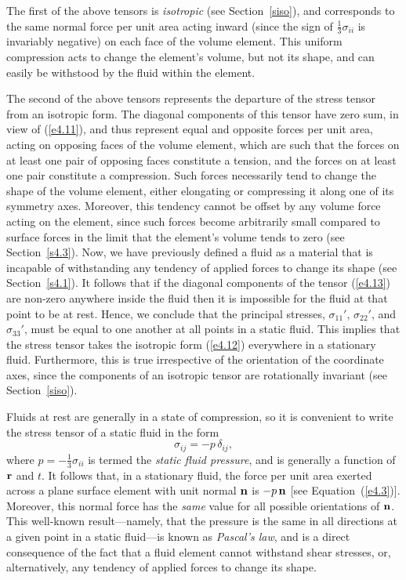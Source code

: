 The first of the above tensors is {\em isotropic}\/ (see Section~\ref{siso}), and corresponds to the same
normal force  per unit area acting inward  (since the sign of $\frac{1}{3}\sigma_{ii}$ is invariably negative) on each face of
the  volume element. This uniform compression  acts to change the element's volume,
but not its shape, and can  easily be withstood by the fluid within the element.

The second of the above tensors represents the departure of the stress tensor from an isotropic form. The diagonal
components of this tensor have zero sum, in view of (\ref{e4.11}), and thus represent equal and opposite forces per unit area,
acting on   opposing faces of the  volume element, which are such that the forces on at least one pair of opposing faces constitute a tension, and
the forces on at least one pair constitute a compression. Such forces necessarily tend to change the shape of the volume element, either elongating
or compressing it along  one of its symmetry axes. Moreover, this tendency cannot  be offset by any
volume force acting on the element, since such forces become arbitrarily small compared
to surface forces in the limit that the element's volume tends to zero (see Section~\ref{s4.3}).
Now, we have previously defined a fluid as a material
that is incapable of withstanding any tendency of applied forces to change its shape (see Section~\ref{s4.1}). It follows that
if the diagonal components of the tensor (\ref{e4.13}) are non-zero anywhere inside the fluid then it is impossible for the fluid at that point to be at rest. Hence,
we conclude that the principal stresses, $\sigma_{11}'$, $\sigma_{22}'$, and $\sigma_{33}'$, 
must be equal to one another  at all points in a static fluid. This  implies
that the stress tensor  takes the isotropic form (\ref{e4.12}) everywhere in a stationary fluid. Furthermore, this
is true irrespective of the orientation of the coordinate axes, since the components of an isotropic
tensor are rotationally invariant (see Section~\ref{siso}). 

Fluids at rest are generally in a state of compression, so it is convenient to write the stress tensor of a static
fluid in the form
\begin{equation}
\sigma_{ij} = - p\,\delta_{ij},
\end{equation}
where $p=-\frac{1}{3}\sigma_{ii}$ is termed the {\em static fluid pressure}, and is generally a function of ${\bf r}$ and $t$. 
It follows that, in a stationary fluid, the force per unit area exerted across a plane surface element
with unit normal ${\bf n}$ is $-p\,{\bf n}$ [see Equation~(\ref{e4.3})]. Moreover, this normal force  has the {\em same}\/ value for
all possible orientations of ${\bf n}$. This well-known result---namely, 
that the   pressure is the same in all directions at a given point in a static fluid---is known as {\em Pascal's law}, and is a direct consequence of the
fact that a fluid element cannot withstand shear stresses, or, alternatively, any tendency of applied forces
to change its shape. 

